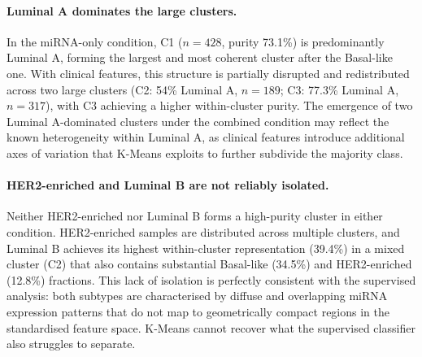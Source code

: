 \paragraph{Luminal A dominates the large clusters.}
In the miRNA-only condition, C1 ($n = 428$, purity 73.1\%) is predominantly
Luminal A, forming the largest and most coherent cluster after the Basal-like one.
With clinical features, this structure is partially disrupted and redistributed
across two large clusters (C2: 54\% Luminal A, $n = 189$; C3: 77.3\% Luminal A,
$n = 317$), with C3 achieving a higher within-cluster purity. The emergence of two
Luminal A-dominated clusters under the combined condition may reflect the known
heterogeneity within Luminal A, as clinical features introduce additional axes of
variation that K-Means exploits to further subdivide the majority class.

\paragraph{HER2-enriched and Luminal B are not reliably isolated.}
Neither HER2-enriched nor Luminal B forms a high-purity cluster in either condition.
HER2-enriched samples are distributed across multiple clusters, and Luminal B
achieves its highest within-cluster representation (39.4\%) in a mixed cluster (C2)
that also contains substantial Basal-like (34.5\%) and HER2-enriched (12.8\%)
fractions. This lack of isolation is perfectly consistent with the supervised
analysis: both subtypes are characterised by diffuse and overlapping miRNA expression
patterns that do not map to geometrically compact regions in the standardised feature
space. K-Means cannot recover what the supervised classifier also struggles to
separate.

